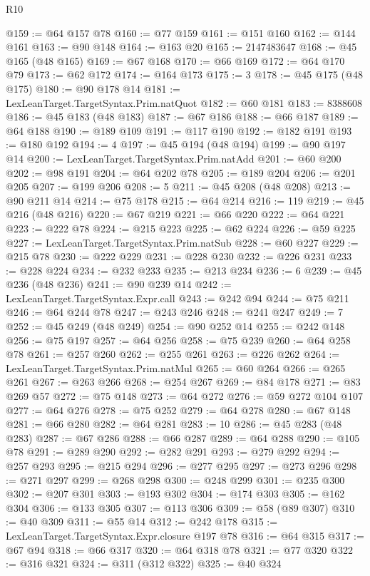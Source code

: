 \begin{lexlean}{R10}
\begin{coremodule}
@159 := @64 @157 @78
@160 := @77 @159
@161 := @151 @160
@162 := @144 @161
@163 := @90 @148
@164 := @163 @20
@165 := 2147483647
@168 := @45 @165 (@48 @165)
@169 := @67 @168
@170 := @66 @169
@172 := @64 @170 @79
@173 := @62 @172
@174 := @164 @173
@175 := 3
@178 := @45 @175 (@48 @175)
@180 := @90 @178 @14
@181 := LexLeanTarget.TargetSyntax.Prim.natQuot
@182 := @60 @181
@183 := 8388608
@186 := @45 @183 (@48 @183)
@187 := @67 @186
@188 := @66 @187
@189 := @64 @188
@190 := @189 @109
@191 := @117 @190
@192 := @182 @191
@193 := @180 @192
@194 := 4
@197 := @45 @194 (@48 @194)
@199 := @90 @197 @14
@200 := LexLeanTarget.TargetSyntax.Prim.natAdd
@201 := @60 @200
@202 := @98 @191
@204 := @64 @202 @78
@205 := @189 @204
@206 := @201 @205
@207 := @199 @206
@208 := 5
@211 := @45 @208 (@48 @208)
@213 := @90 @211 @14
@214 := @75 @178
@215 := @64 @214
@216 := 119
@219 := @45 @216 (@48 @216)
@220 := @67 @219
@221 := @66 @220
@222 := @64 @221
@223 := @222 @78
@224 := @215 @223
@225 := @62 @224
@226 := @59 @225
@227 := LexLeanTarget.TargetSyntax.Prim.natSub
@228 := @60 @227
@229 := @215 @78
@230 := @222 @229
@231 := @228 @230
@232 := @226 @231
@233 := @228 @224
@234 := @232 @233
@235 := @213 @234
@236 := 6
@239 := @45 @236 (@48 @236)
@241 := @90 @239 @14
@242 := LexLeanTarget.TargetSyntax.Expr.call
@243 := @242 @94
@244 := @75 @211
@246 := @64 @244 @78
@247 := @243 @246
@248 := @241 @247
@249 := 7
@252 := @45 @249 (@48 @249)
@254 := @90 @252 @14
@255 := @242 @148
@256 := @75 @197
@257 := @64 @256
@258 := @75 @239
@260 := @64 @258 @78
@261 := @257 @260
@262 := @255 @261
@263 := @226 @262
@264 := LexLeanTarget.TargetSyntax.Prim.natMul
@265 := @60 @264
@266 := @265 @261
@267 := @263 @266
@268 := @254 @267
@269 := @84 @178
@271 := @83 @269 @57
@272 := @75 @148
@273 := @64 @272
@276 := @59 @272 @104 @107
@277 := @64 @276
@278 := @75 @252
@279 := @64 @278
@280 := @67 @148
@281 := @66 @280
@282 := @64 @281
@283 := 10
@286 := @45 @283 (@48 @283)
@287 := @67 @286
@288 := @66 @287
@289 := @64 @288
@290 := @105 @78
@291 := @289 @290
@292 := @282 @291
@293 := @279 @292
@294 := @257 @293
@295 := @215 @294
@296 := @277 @295
@297 := @273 @296
@298 := @271 @297
@299 := @268 @298
@300 := @248 @299
@301 := @235 @300
@302 := @207 @301
@303 := @193 @302
@304 := @174 @303
@305 := @162 @304
@306 := @133 @305
@307 := @113 @306
@309 := @58 (@89 @307)
@310 := @40 @309
@311 := @55 @14
@312 := @242 @178
@315 := LexLeanTarget.TargetSyntax.Expr.closure @197 @78
@316 := @64 @315
@317 := @67 @94
@318 := @66 @317
@320 := @64 @318 @78
@321 := @77 @320
@322 := @316 @321
@324 := @311 (@312 @322)
@325 := @40 @324

\end{coremodule}
\end{lexlean}
